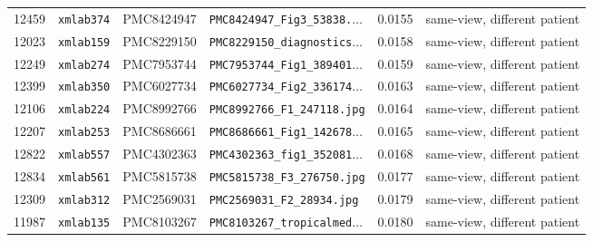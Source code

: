 \begin{longtable}{llllcl}
12459 & \texttt{xmlab374} & PMC8424947 & \texttt{PMC8424947\_Fig3\_53838.$\dots$} & 0.0155 & same-view, different patient \\
12023 & \texttt{xmlab159} & PMC8229150 & \texttt{PMC8229150\_diagnostics$\dots$} & 0.0158 & same-view, different patient \\
12249 & \texttt{xmlab274} & PMC7953744 & \texttt{PMC7953744\_Fig1\_389401$\dots$} & 0.0159 & same-view, different patient \\
12399 & \texttt{xmlab350} & PMC6027734 & \texttt{PMC6027734\_Fig2\_336174$\dots$} & 0.0163 & same-view, different patient \\
12106 & \texttt{xmlab224} & PMC8992766 & \texttt{PMC8992766\_F1\_247118.jpg} & 0.0164 & same-view, different patient \\
12207 & \texttt{xmlab253} & PMC8686661 & \texttt{PMC8686661\_Fig1\_142678$\dots$} & 0.0165 & same-view, different patient \\
12822 & \texttt{xmlab557} & PMC4302363 & \texttt{PMC4302363\_fig1\_352081$\dots$} & 0.0168 & same-view, different patient \\
12834 & \texttt{xmlab561} & PMC5815738 & \texttt{PMC5815738\_F3\_276750.jpg} & 0.0177 & same-view, different patient \\
12309 & \texttt{xmlab312} & PMC2569031 & \texttt{PMC2569031\_F2\_28934.jpg} & 0.0179 & same-view, different patient \\
11987 & \texttt{xmlab135} & PMC8103267 & \texttt{PMC8103267\_tropicalmed$\dots$} & 0.0180 & same-view, different patient \\
\bottomrule
\end{longtable}
